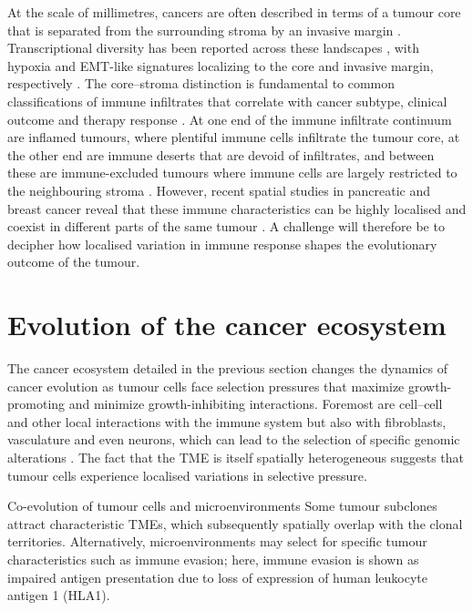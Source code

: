 At the scale of millimetres, cancers are often described in terms of a tumour core that is separated from the surrounding stroma by an invasive margin . Transcriptional diversity has been reported across these landscapes \parencite{Berglund2018-gh}, with hypoxia and \ac{EMT}-like signatures localizing to the core and invasive margin, respectively \parencite{Puram2017-mn,Thomlinson1955-em}. The core–stroma distinction is fundamental to common classifications of immune infiltrates that correlate with cancer subtype, clinical outcome and therapy response \parencite{Hammerl2021-fs,Keren2018-or,Galon2014-oi}. At one end of the immune infiltrate continuum are inflamed tumours, where plentiful immune cells infiltrate the tumour core, at the other end are immune deserts that are devoid of infiltrates, and between these are immune-excluded tumours where immune cells are largely restricted to the neighbouring stroma \parencite{Hegde2020-sw}. However, recent spatial studies in pancreatic and breast cancer reveal that these immune characteristics can be highly localised and coexist in different parts of the same tumour \parencite{Danenberg2022-zb,Grunwald2021-zk,Tavernari2021-yb}. A challenge will therefore be to decipher how localised variation in immune response shapes the evolutionary outcome of the tumour.

\section{Evolution of the cancer ecosystem}

The cancer ecosystem detailed in the previous section changes the dynamics of cancer evolution as tumour cells face selection pressures that maximize growth-promoting and minimize growth-inhibiting interactions. Foremost are cell–cell and other local interactions with the immune system but also with fibroblasts, vasculature and even neurons, which can lead to the selection of specific genomic alterations . The fact that the \ac{TME} is itself spatially heterogeneous suggests that tumour cells experience localised variations in selective pressure.

    {Co-evolution of tumour cells and microenvironments \parencite{Seferbekova2023-wg}}
    {Some tumour subclones attract characteristic \acfp{TME}, which subsequently spatially overlap with the clonal territories. Alternatively, microenvironments may select for specific tumour characteristics such as immune evasion; here, immune evasion is shown as impaired antigen presentation due to loss of expression of human leukocyte antigen 1 (HLA1).}

